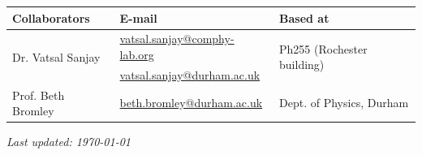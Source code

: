 \documentclass[11pt]{article}
\begin{document}
\begin{center}
\begin{tabular}{|l|l|l|}
\hline \textbf{Collaborators} & \textbf{E-mail} & \textbf{Based at} \\
\hline \multirow{2}{*}{Dr. Vatsal Sanjay} & \href{mailto:vatsal.sanjay@comphy-lab.org}{vatsal.sanjay@comphy-lab.org} & \multirow{2}{*}{Ph255 (Rochester building)} \\
& \href{mailto:vatsal.sanjay@durham.ac.uk}{vatsal.sanjay@durham.ac.uk} & \\
\hline Prof. Beth Bromley & \href{mailto:beth.bromley@durham.ac.uk}{beth.bromley@durham.ac.uk} & Dept. of Physics, Durham \\
\hline
\end{tabular}
\end{center}

\vspace{1em}
\noindent\textit{Last updated: \today}

\printbibliography
\end{document}
